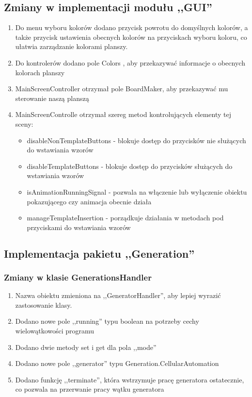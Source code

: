 \documentclass[a4paper,11pt]{article}
\begin{document}
\subsection{Zmiany w implementacji modułu ,,GUI''}

\begin{enumerate}
\item Do menu wyboru kolorów dodano przycisk powrotu do domyślnych kolorów, a także przycisk ustawienia obecnych kolorów na przyciskach wyboru koloru, co ułatwia zarządzanie kolorami planszy.
\item Do kontrolerów dodano pole Colors , aby przekazywać informacje o obecnych kolorach planszy
\item MainScreenController otrzymał pole BoardMaker, aby przekazywać mu sterowanie naszą planszą
\item MainScreenControlle otrzymał szereg metod kontrolujących elementy tej sceny:
	\begin{itemize}
	\item disableNonTemplateButtons - blokuje dostęp do przycisków nie służących do wstawiania wzorów
	\item disableTemplateButtons - blokuje dostęp do przycisków służących do wstawiania wzorów
	\item isAnimationRunningSignal - pozwala na włączenie lub wyłączenie obiektu pokazującego czy animacja obecnie działa
	\item manageTemplateInsertion - porządkuje działania w metodach pod przyciskami do wstawiania wzorów
	\end{itemize}
\end{enumerate}

\subsection{Implementacja pakietu ,,Generation''}
\subsubsection{Zmiany w klasie GenerationsHandler}
\begin{enumerate}
\item Nazwa obiektu zmieniona na ,,GeneratorHandler'', aby lepiej wyrazić zastosowanie klasy.
\item Dodano nowe pole ,,running'' typu boolean na potrzeby cechy wielowątkowości programu
\item Dodano dwie metody set i get dla pola ,,mode''
\item Dodano nowe pole ,,generator'' typu Generation.CellularAutomation
\item Dodano funkcję ,,terminate'', która wstrzymuje pracę generatora ostatecznie, co pozwala na przerwanie pracy wątku generatora
\end{enumerate}
\end{document}
